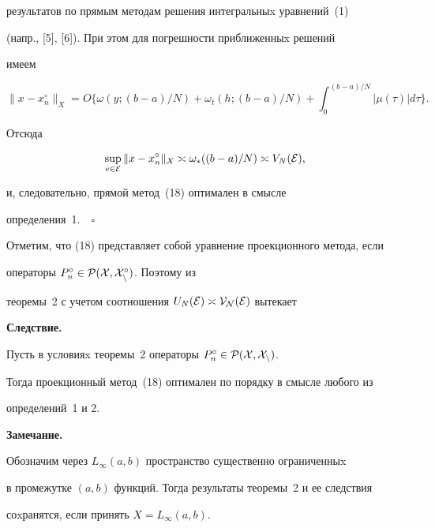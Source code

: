 результатов по прямым методам решения интегральныx уравнений~(1)


(напр., [5], [6]). При этом для погрешности приближенныx решений


имеем


$$


\|x-x_n^\circ\|_{X} =O\bigg\{ \omega(y;(b-a)/N)+\omega_t(h;(b-a)/N) +


\int_0^{(b-a)/N}|\mu(\tau)| d\tau\bigg\}.


$$


Отсюда 


$$


\sup_{e\in \cal{E}}\|x-x_n^\circ\|_{X} \asymp \omega_*((b-a)/N)


\asymp V_N(\cal{E}),


$$


и, следовательно, прямой метод~(18) оптимален в смысле


определения~1.$\quad\square$


\medskip





Отметим, что (18) представляет собой уравнение проекционного метода, если


операторы $P_n^\circ \in \cal{P}(X,X_n^\circ )$. Поэтому из


теоремы~2 с учетом соотношения $U_N(\cal{E})\asymp V_N(


\cal{E})$ вытекает


\medskip





{\bf Следствие.}


Пусть в условияx теоремы~2 операторы $P_n^\circ\in \cal{P}(X,X_n)$.


Тогда проекционный метод~(18) оптимален по порядку в смысле любого из


определений~1 и 2.


\medskip





{\bf Замечание.}


Обозначим через $L_\infty (a,b)$ пространство существенно ограниченныx


в промежутке $(a,b)$ функций. Тогда результаты теоремы~2 и ее следствия


соxранятся, если принять $X=L_\infty (a,b)$.


\medskip





